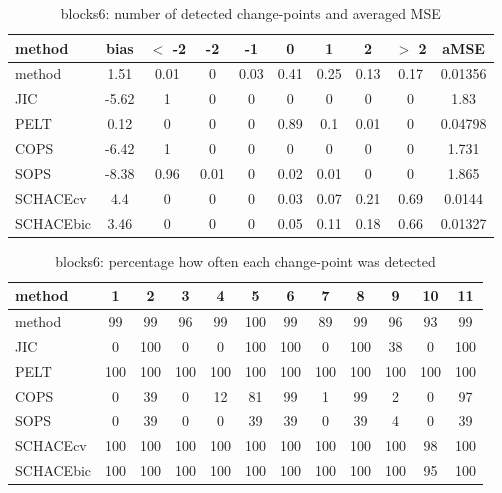 \begin{table}[ht]
\centering
\begin{tabular}{l|c|ccccccc|c}
  \hline
method & bias & $<$ -2 & -2 & -1 & 0 & 1 & 2 & $>$ 2 & aMSE \\ 
  \hline
method &  1.51 &  0.01 &     0 &  0.03 &  0.41 &  0.25 &  0.13 &  0.17 & 0.01356 \\ 
  JIC & -5.62 &     1 &     0 &     0 &     0 &     0 &     0 &     0 &  1.83 \\ 
  PELT &  0.12 &     0 &     0 &     0 &  0.89 &   0.1 &  0.01 &     0 & 0.04798 \\ 
  COPS & -6.42 &     1 &     0 &     0 &     0 &     0 &     0 &     0 & 1.731 \\ 
  SOPS & -8.38 &  0.96 &  0.01 &     0 &  0.02 &  0.01 &     0 &     0 & 1.865 \\ 
  SCHACEcv &   4.4 &     0 &     0 &     0 &  0.03 &  0.07 &  0.21 &  0.69 & 0.0144 \\ 
  SCHACEbic &  3.46 &     0 &     0 &     0 &  0.05 &  0.11 &  0.18 &  0.66 & 0.01327 \\ 
   \hline
\end{tabular}
\caption{blocks6: number of detected change-points and averaged MSE} 
\label{tab:blocks6Njumps}
\end{table}
\begin{table}[ht]
\centering
\begin{tabular}{l|ccccccccccc}
  \hline
method & 1 & 2 & 3 & 4 & 5 & 6 & 7 & 8 & 9 & 10 & 11 \\ 
  \hline
method &     99 &     99 &     96 &     99 &    100 &     99 &     89 &     99 &     96 &     93 &     99 \\ 
  JIC &      0 &    100 &      0 &      0 &    100 &    100 &      0 &    100 &     38 &      0 &    100 \\ 
  PELT &    100 &    100 &    100 &    100 &    100 &    100 &    100 &    100 &    100 &    100 &    100 \\ 
  COPS &      0 &     39 &      0 &     12 &     81 &     99 &      1 &     99 &      2 &      0 &     97 \\ 
  SOPS &      0 &     39 &      0 &      0 &     39 &     39 &      0 &     39 &      4 &      0 &     39 \\ 
  SCHACEcv &    100 &    100 &    100 &    100 &    100 &    100 &    100 &    100 &    100 &     98 &    100 \\ 
  SCHACEbic &    100 &    100 &    100 &    100 &    100 &    100 &    100 &    100 &    100 &     95 &    100 \\ 
   \hline
\end{tabular}
\caption{blocks6: percentage how often each change-point was detected} 
\label{tab:blocks6Detections}
\end{table}
